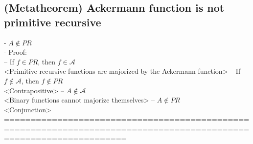 \documentclass{book}
\newcommand{\inot}{\not}
\begin{document}
\subsection{(Metatheorem) Ackermann function is not primitive recursive} %
	- $A \inot \in PR$ \\
	- Proof: \\
		-- If $f \in PR$, then $f \in \mathcal{A}$ \\ <Primitive recursive functions are majorized by the Ackermann function>
		-- If $f \inot \in \mathcal{A}$, then $f \inot \in PR$ \\ <Contrapositive>
		-- $A \inot \in \mathcal{A}$ \\ <Binary functions cannot majorize themselves>
		-- $A \inot \in PR$ \\ <Conjunction>
	===================================================================================================================
\end{document}
